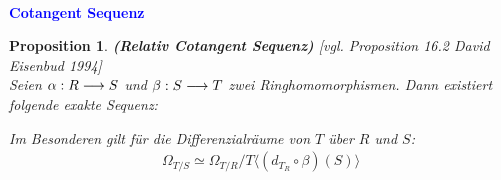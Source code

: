 \documentclass[10pt,a4paper]{report}
\newcommand{\ModulsOfDifferenzials}{David Eisenbud 1994}
\newcounter{Aussage}[chapter]
\newtheorem{prop}[Aussage]{Proposition}
\newcommand{\functionfront}[3]{\nolinebreak{#1:#2 \longrightarrow #3}}
\newcommand{\divR}[2]{\Omega_{#1/#2}}
\newcommand{\divf}[1]{d_{#1}}
\newcommand{\Tensor}[3]{#1 \otimes_{#2} #3}
\newcommand{\tensor}[3]{#1 \otimes #3}
\begin{document}
\ \\
\textcolor{blue}{\textbf{Cotangent Sequenz}}
\begin{prop}\label{Cotangent Sequenz} \textbf{(Relativ Cotangent Sequenz)} \textit{[vgl. Proposition 16.2 \ModulsOfDifferenzials]}\\
Seien $\functionfront{\alpha}{R}{S}$ und $\functionfront{\beta}{S}{T}$ zwei Ringhomomorphismen. Dann existiert folgende exakte Sequenz:
\begin{center}
\end{center}
Im Besonderen gilt für die Differenzialräume von $T$ über $R$ und $S$:
\begin{gather*}
\divR{T}{S} \simeq \divR{T}{R}/T \langle (\divf{T_R} \circ \beta)(S) \rangle
\end{gather*}
\end{prop}
\end{document}
